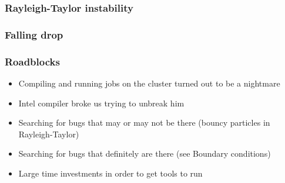 \begin{frame}
	\frametitle{Rayleigh-Taylor instability}
	\begin{figure}[h!]
		\centering    
	\end{figure} 
\end{frame}

\begin{frame}
	\frametitle{Falling drop}
	\begin{figure}[h!]
		\centering    
	\end{figure} 
\end{frame}

\begin{frame}
	\frametitle{Roadblocks}
	\large
	\begin{itemize}
		\item Compiling and running jobs on the cluster turned out to be a nightmare
		\item Intel compiler broke us trying to unbreak him
		\item Searching for bugs that may or may not be there (bouncy particles in Rayleigh-Taylor)
		\item Searching for bugs that definitely are there (see Boundary conditions)
		\item Large time investments in order to get tools to run
	\end{itemize}
\end{frame}

